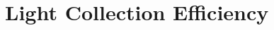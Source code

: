 \documentclass[herrin-thesis.tex]{subfiles}
\begin{document}
\chapter{Light Collection Efficiency}
\label{app:lightmap}
\end{document}

